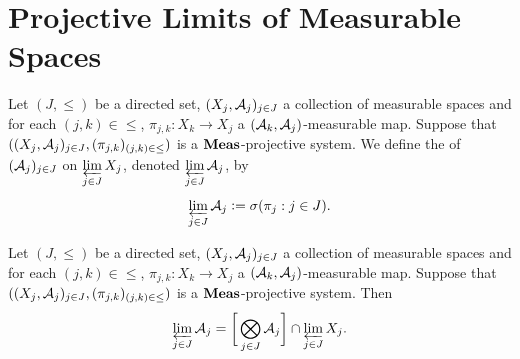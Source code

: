 \documentclass{book}
\begin{document}
\newpage
\section{Projective Limits of Measurable Spaces}

\begin{defn} 
	Let $(J, \leq)$ be a directed set, $(X_j, \mathcal{A}_j)_{j \in J}$ a collection of measurable spaces and for each $(j,k) \in \leq$, $\pi_{j,k}:X_k \rightarrow X_j$ a $(\mathcal{A}_k, \mathcal{A}_j)$-measurable map. Suppose that $((X_j, \mathcal{A}_j)_{j \in J}, (\pi_{j,k})_{(j,k) \in \leq})$ is a $\operatorname{\text{\textbf{Meas}}}$-projective system. We define the  of $(\mathcal{A}_j)_{j \in J}$ on $\varprojlim\limits_{j \in J} X_j$, denoted $\varprojlim\limits_{j \in J} \mathcal{A}_j$, by $$\varprojlim\limits_{j \in J} \mathcal{A}_j \vcentcolon= \sigma ( \pi_j: j \in J).$$
\end{defn}

\begin{ex}  
	Let $(J, \leq)$ be a directed set, $(X_j, \mathcal{A}_j)_{j \in J}$ a collection of measurable spaces and for each $(j,k) \in \leq$, $\pi_{j,k}:X_k \rightarrow X_j$ a $(\mathcal{A}_k, \mathcal{A}_j)$-measurable map. Suppose that $((X_j, \mathcal{A}_j)_{j \in J}, (\pi_{j,k})_{(j,k) \in \leq})$ is a $\operatorname{\text{\textbf{Meas}}}$-projective system. Then 
	$$\varprojlim\limits_{j \in J} \mathcal{A}_j = \bigg[ \bigotimes\limits_{j \in J} \mathcal{A}_j \bigg] \cap \varprojlim\limits_{j \in J} X_j.$$
\end{ex}
\end{document}
